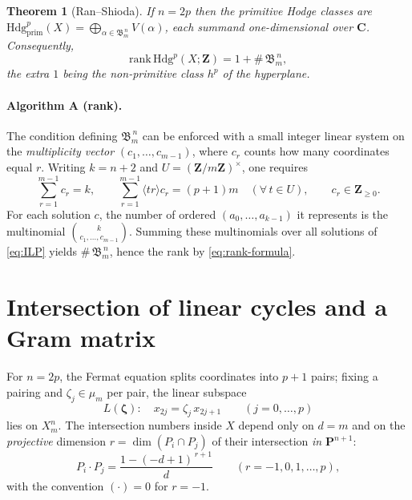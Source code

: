 \documentclass[11pt]{article}
\newtheorem{theorem}{Theorem}
\theoremstyle{definition}
\newcommand{\Xmn}{X_m^n}
\newcommand{\PP}{\mathbf{P}}
\newcommand{\ZZ}{\mathbf{Z}}
\newcommand{\CC}{\mathbf{C}}
\newcommand{\Hdg}{\mathrm{Hdg}}
\newcommand{\rank}{\mathrm{rank}}
\begin{document}
\begin{theorem}[Ran--Shioda]
If \(n=2p\) then the primitive Hodge classes are
\(\Hdg^p_{\mathrm{prim}}(X)=\bigoplus_{\alpha\in \mathfrak B_m^{\,n}} V(\alpha)\), each summand one-dimensional over \(\CC\). Consequently,
\begin{equation}\label{eq:rank-formula}
\rank\,\Hdg^p(X;\ZZ)=1+\#\,\mathfrak B_m^{\,n},
\end{equation}
the extra \(1\) being the non-primitive class \(h^p\) of the hyperplane.
\end{theorem}

\paragraph{Algorithm A (rank).} The condition defining \(\mathfrak B_m^{\,n}\) can be enforced with a small integer linear system on the \emph{multiplicity vector} \((c_1,\dots,c_{m-1})\), where \(c_r\) counts how many coordinates equal \(r\). Writing \(k=n+2\) and \(U=(\ZZ/m\ZZ)^\times\), one requires
\begin{equation}\label{eq:ILP}
\sum_{r=1}^{m-1} c_r = k,\qquad \sum_{r=1}^{m-1}\big\langle t r\big\rangle c_r = (p+1)m\quad(\forall\,t\in U),\qquad c_r\in\ZZ_{\ge 0}.
\end{equation}
For each solution \(c\), the number of ordered \((a_0,\dots,a_{k-1})\) it represents is the multinomial \(\binom{k}{c_1,\dots,c_{m-1}}\). Summing these multinomials over all solutions of \eqref{eq:ILP} yields \(\#\,\mathfrak B_m^{\,n}\), hence the rank by \eqref{eq:rank-formula}.

\medskip
\section{Intersection of linear cycles and a Gram matrix}
For \(n=2p\), the Fermat equation splits coordinates into \(p+1\) pairs; fixing a pairing and \(\zeta_j\in\mu_m\) per pair, the linear subspace
\begin{equation}\label{eq:linear-cycle}
L(\boldsymbol\zeta):\quad x_{2j}=\zeta_j\,x_{2j+1}\qquad (j=0,\dots,p)
\end{equation}
lies on \(\Xmn\). The intersection numbers inside \(X\) depend only on \(d=m\) and on the \emph{projective} dimension \(r=\dim(P_i\cap P_j)\) of their intersection \emph{in} \(\PP^{n+1}\):
\begin{equation}\label{eq:AMV-formula}
P_i\cdot P_j=\frac{1-(-d+1)^{\,r+1}}{d}\qquad(r=-1,0,1,\dots,p),
\end{equation}
with the convention \((\cdot)=0\) for $r=-1$.
\end{document}
